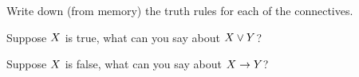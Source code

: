 %
%
%
%




\begin{practiceproblems}
		\problempart 
	Write down (from memory) the truth rules for each of the connectives. 
	
	\problempart 
	\begin{problemslist}
		\item Suppose $X$ is true, what can you say about $X\vee Y$?
		\item Suppose $X$ is false, what can you say about $X\rightarrow Y$?
	\end{problemslist}
\end{practiceproblems}




